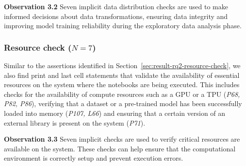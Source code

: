 \documentclass[smallextended]{svjour3}       %
\newcommand{\highlight}[1]{\begin{framed}%
  \noindent#1
\end{framed}}
\providecommand{\DIFaddbegin}{} %
\providecommand{\DIFaddend}{} %
\providecommand{\DIFdelbegin}{} %
\providecommand{\DIFdelend}{} %
\newcommand{\DIFscaledelfig}{0.5}
\newlength{\DIFdelgraphicswidth} %
\newlength{\DIFdelgraphicsheight} %
\newcommand{\DIFaddincludegraphics}[2][]{{\color{blue}\fbox{\DIFOincludegraphics[#1]{#2}}}} %
\newcommand{\DIFdelincludegraphics}[2][]{%
\sbox{\DIFdelgraphicsbox}{\DIFOincludegraphics[#1]{#2}}%
\settoboxwidth{\DIFdelgraphicswidth}{\DIFdelgraphicsbox} %
\settoboxtotalheight{\DIFdelgraphicsheight}{\DIFdelgraphicsbox} %
\scalebox{\DIFscaledelfig}{%
\parbox[b]{\DIFdelgraphicswidth}{\usebox{\DIFdelgraphicsbox}\\[-\baselineskip] \rule{\DIFdelgraphicswidth}{0em}}\llap{\resizebox{\DIFdelgraphicswidth}{\DIFdelgraphicsheight}{%
\setlength{\unitlength}{\DIFdelgraphicswidth}%
\begin{picture}(1,1)%
\thicklines\linethickness{2pt} %
{\color[rgb]{1,0,0}\put(0,0){\framebox(1,1){}}}%
{\color[rgb]{1,0,0}\put(0,0){\line( 1,1){1}}}%
{\color[rgb]{1,0,0}\put(0,1){\line(1,-1){1}}}%
\end{picture}%
}\hspace*{3pt}}} %
} %
\DeclareRobustCommand{\DIFaddbegin}{\DIFOaddbegin \let\includegraphics\DIFaddincludegraphics} %
\DeclareRobustCommand{\DIFaddend}{\DIFOaddend \let\includegraphics\DIFOincludegraphics} %
\DeclareRobustCommand{\DIFdelbegin}{\DIFOdelbegin \let\includegraphics\DIFdelincludegraphics} %
\DeclareRobustCommand{\DIFdelend}{\DIFOaddend \let\includegraphics\DIFOincludegraphics} %
\begin{document}
\DIFdelbegin %
\DIFdelend \DIFaddbegin \highlight{\textbf{Observation 3.2} Seven implicit data distribution checks are used to make informed decisions about data transformations, ensuring data integrity and improving model training reliability during the exploratory data analysis phase.}
\DIFaddend 

\subsubsection{Resource check ($N = 7$)}\label{sec:implicit-resource-check}

Similar to the assertions identified in Section~\ref{sec:result-rq2-resource-check}, we also find print and last cell statements that validate the availability of essential resources on the system where the notebooks are being executed. This includes checks for the availability of compute resources such as a GPU or a TPU (\emph{P68, P82, P86}), verifying that a dataset or a pre-trained model has been successfully loaded into memory (\emph{P107, L66}) and ensuring that a certain version of an external library is present on the system (\emph{P71}).

\DIFdelbegin %
\DIFdelend \DIFaddbegin \highlight{\textbf{Observation 3.3} Seven implicit checks are used to verify critical resources are available on the system. These checks can help ensure that the computational environment is correctly setup and prevent execution errors.}
\DIFaddend 
\end{document}
